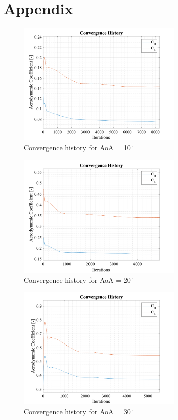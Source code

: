 \section*{Appendix}


\begin{figure}[H]
 \centering
 \includegraphics[width=0.7\textwidth]{matlab_images/10_conv_history.png}
 \caption{Convergence history for AoA = 10$^\circ$}
 \label{fig: conv_hist_10}
\end{figure}

\begin{figure}[H]
 \centering
 \includegraphics[width=0.7\textwidth]{matlab_images/20_conv_history.png}
 \caption{Convergence history for AoA = 20$^\circ$}
 \label{fig: conv_hist_20}
\end{figure}

\begin{figure}[H]
 \centering
 \includegraphics[width=0.7\textwidth]{matlab_images/30_conv_history.png}
 \caption{Convergence history for AoA = 30$^\circ$}
 \label{fig: conv_hist_30}
\end{figure}

